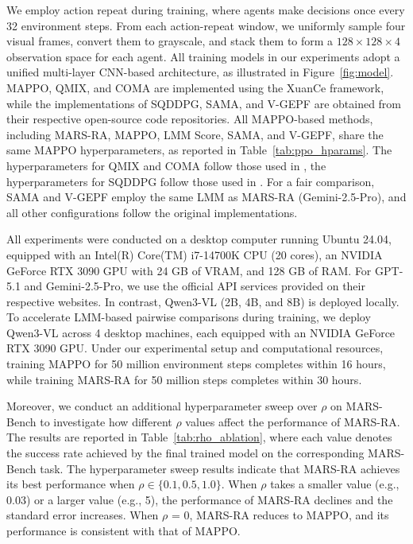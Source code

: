 \documentclass[11pt]{article}
\begin{document}
We employ action repeat during training, where agents make decisions once every 32 environment steps. From each action-repeat window, we uniformly sample four visual frames, convert them to grayscale, and stack them to form a $128 \times 128 \times 4$ observation space for each agent. All training models in our experiments adopt a unified multi-layer CNN-based architecture, as illustrated in Figure~\ref{fig:model}. MAPPO, QMIX, and COMA are implemented using the XuanCe \cite{liu2023xuance} framework, while the implementations of SQDDPG, SAMA, and V-GEPF are obtained from their respective open-source code repositories. All MAPPO-based methods, including MARS-RA, MAPPO, LMM Score, SAMA, and V-GEPF, share the same MAPPO hyperparameters, as reported in Table~\ref{tab:ppo_hparams}. The hyperparameters for QMIX and COMA follow those used in \citet{papoudakis2020benchmarking}, the hyperparameters for SQDDPG follow those used in \citet{wang2022shaq}. For a fair comparison, SAMA and V-GEPF employ the same LMM as MARS-RA (Gemini-2.5-Pro), and all other configurations follow the original implementations.

All experiments were conducted on a desktop computer running Ubuntu 24.04, equipped with an Intel(R) Core(TM) i7-14700K CPU (20 cores), an NVIDIA GeForce RTX 3090 GPU with 24 GB of VRAM, and 128 GB of RAM. For GPT-5.1 and Gemini-2.5-Pro, we use the official API services provided on their respective websites. In contrast, Qwen3-VL (2B, 4B, and 8B) is deployed locally. To accelerate LMM-based pairwise comparisons during training, we deploy Qwen3-VL across 4 desktop machines, each equipped with an NVIDIA GeForce RTX 3090 GPU. Under our experimental setup and computational resources, training MAPPO for 50 million environment steps completes within 16 hours, while training MARS-RA for 50 million steps completes within 30 hours.

Moreover, we conduct an additional hyperparameter sweep over $\rho$ on MARS-Bench to investigate how different $\rho$ values affect the performance of MARS-RA. The results are reported in Table~\ref{tab:rho_ablation}, where each value denotes the success rate achieved by the final trained model on the corresponding MARS-Bench task. The hyperparameter sweep results indicate that MARS-RA achieves its best performance when $\rho \in \{0.1, 0.5, 1.0\}$. When $\rho$ takes a smaller value (e.g., 0.03) or a larger value (e.g., 5), the performance of MARS-RA declines and the standard error increases. When $\rho$ = 0, MARS-RA reduces to MAPPO, and its performance is consistent with that of MAPPO.
\end{document}
